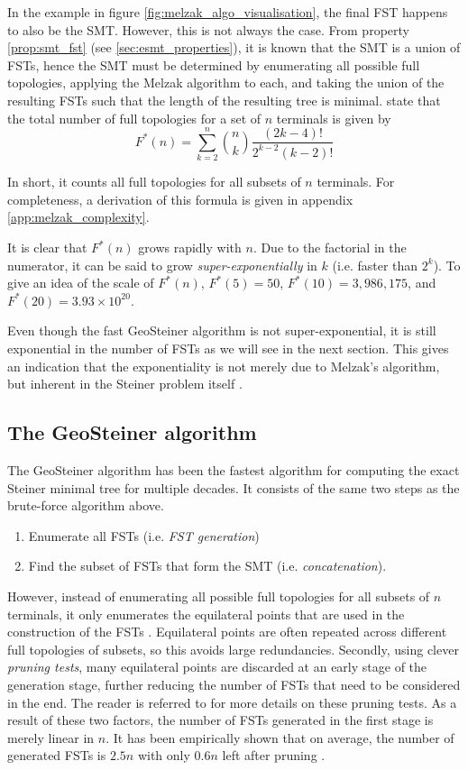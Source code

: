 \documentclass{l4proj}
\begin{document}
In the example in figure \ref{fig:melzak_algo_visualisation}, the final FST happens to also be the SMT. However, this is not always the case. From property \ref{prop:smt_fst} (see \ref{sec:esmt_properties}), it is known that the SMT is a union of FSTs, hence the SMT must be determined by enumerating all possible full topologies, applying the Melzak algorithm to each, and taking the union of the resulting FSTs such that the length of the resulting tree is minimal. \cite{geosteiner96} state that the total number of full topologies for a set of $n$ terminals is given by
$$
    F^*(n) = \sum_{k=2}^{n} \binom{n}{k}\frac{(2k - 4)!}{2^{k-2}(k-2)!}
$$

In short, it counts all full topologies for all subsets of $n$ terminals.
For completeness, a derivation of this formula is given in appendix \ref{app:melzak_complexity}.

It is clear that $F^*(n)$ grows rapidly with $n$. Due to the factorial in the numerator, it can be said to grow \textit{super-exponentially} in $k$ (i.e. faster than $2^k$). To give an idea of the scale of $F^*(n)$, $F^*(5) = 50$, $F^*(10) = 3,986,175$, and $F^*(20) = 3.93 \times 10^{20}$.

Even though the fast GeoSteiner algorithm is not super-exponential, it is still exponential in the number of FSTs as we will see in the next section. This gives an indication that the exponentiality is not merely due to Melzak's algorithm, but inherent in the Steiner problem itself \citep{Steiner_tree_problems_hwang}.

\subsection{The GeoSteiner algorithm}
The GeoSteiner algorithm has been the fastest algorithm for computing the exact Steiner minimal tree for multiple decades.
It consists of the same two steps as the brute-force algorithm above.
\begin{enumerate}
    \item Enumerate all FSTs (i.e. \textit{FST generation})
    \item Find the subset of FSTs that form the SMT (i.e. \textit{concatenation}).
\end{enumerate}
However, instead of enumerating all possible full topologies for all subsets of $n$ terminals, it only enumerates the equilateral points that are used in the construction of the FSTs \citep{geosteiner96}. Equilateral points are often repeated across different full topologies of subsets, so this avoids large redundancies. Secondly, using clever \textit{pruning tests}, many equilateral points are discarded at an early stage of the generation stage, further reducing the number of FSTs that need to be considered in the end. The reader is referred to \cite{geosteiner96} for more details on these pruning tests.
As a result of these two factors, the number of FSTs generated in the first stage is merely linear in $n$. It has been empirically shown that on average, the number of generated FSTs is $2.5n$ with only $0.6n$ left after pruning \citep{29ee725d11ac4584b72f7fe66c4326fa}.
\end{document}
